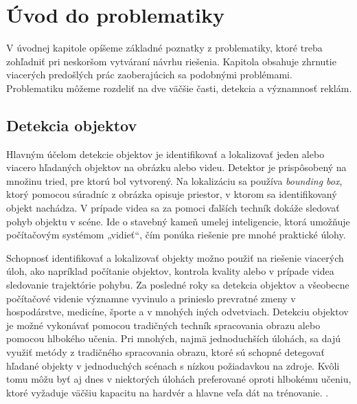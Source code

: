 \chapter{Úvod do problematiky}\label{chap:overview}

V úvodnej kapitole opíšeme základné poznatky z problematiky, ktoré treba zohľadniť pri neskoršom vytváraní návrhu riešenia. Kapitola obsahuje zhrnutie viacerých predošlých prác zaoberajúcich sa podobnými problémami. Problematiku môžeme rozdeliť na dve väčšie časti, detekcia a významnosť reklám.

\section{Detekcia objektov}


Hlavným účelom detekcie objektov je identifikovať a lokalizovať jeden alebo viacero hľadaných objektov na obrázku alebo videu. Detektor je prispôsobený na množinu tried, pre ktorú bol vytvorený. Na lokalizáciu sa používa \textit{bounding box}, ktorý pomocou súradníc z obrázka opisuje priestor, v ktorom sa identifikovaný objekt nachádza. V prípade videa sa za pomoci ďalších techník dokáže sledovať pohyb objektu v scéne. Ide o stavebný kameň umelej inteligencie, ktorá umožňuje počítačovým systémom „vidieť“, čím ponúka riešenie pre mnohé praktické úlohy.

Schopnosť identifikovať a lokalizovať objekty možno použiť na riešenie viacerých úloh, ako napríklad počítanie objektov, kontrola kvality alebo v prípade videa sledovanie trajektórie pohybu. Za posledné roky sa detekcia objektov a všeobecne počítačové videnie významne vyvinulo a prinieslo prevratné zmeny v hospodárstve, medicíne, športe a v mnohých iných odvetviach. Detekciu objektov je možné vykonávať pomocou tradičných techník spracovania obrazu alebo pomocou hlbokého učenia. Pri mnohých, najmä jednoduchších úlohách, sa dajú využiť metódy z tradičného spracovania obrazu, ktoré sú schopné detegovať hľadané objekty v jednoduchých scénach s nízkou požiadavkou na zdroje. Kvôli tomu môžu byť aj dnes v niektorých úlohách preferované oproti hlbokému učeniu, ktoré vyžaduje väčšiu kapacitu na hardvér a hlavne veľa dát na trénovanie. \cite{CV-vs-DL}.

